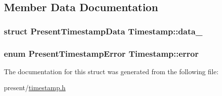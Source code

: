 \subsection{\-Member \-Data \-Documentation}
\hypertarget{structTimestamp_adf3177050edc50aa8b6e768922e4cf56}{
\subsubsection[{data\-\_\-}]{\setlength{\rightskip}{0pt plus 5cm}struct \-Present\-Timestamp\-Data {\bf \-Timestamp\-::data\-\_\-}}}\label{structTimestamp_adf3177050edc50aa8b6e768922e4cf56}
\hypertarget{structTimestamp_a2ac4b53468d2a270e2ba5f05af9d7472}{
\subsubsection[{error}]{\setlength{\rightskip}{0pt plus 5cm}enum {\bf \-Present\-Timestamp\-Error} {\bf \-Timestamp\-::error}}}\label{structTimestamp_a2ac4b53468d2a270e2ba5f05af9d7472}


\-The documentation for this struct was generated from the following file\-:\begin{DoxyCompactItemize}
\item 
present/\hyperlink{timestamp_8h}{timestamp.\-h}\end{DoxyCompactItemize}
